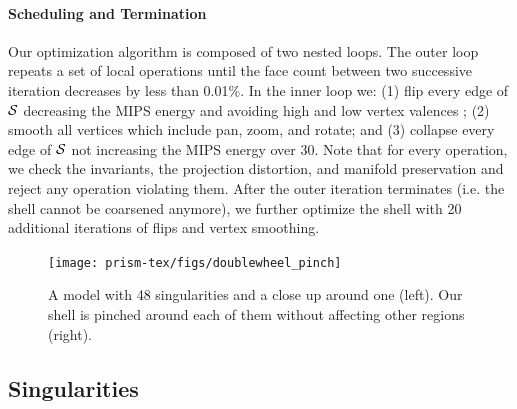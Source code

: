 \paragraph{Scheduling and Termination}
Our optimization algorithm is composed of two nested loops. The outer loop repeats a set of local operations until the face count between two successive iteration decreases by less than 0.01\%. In the inner loop we: (1) flip every edge of $\S$ decreasing  the MIPS energy and avoiding high and low vertex valences \cite{dunyach2013adaptive}; (2) smooth all vertices which include pan, zoom, and rotate; and (3) collapse every edge of $\S$ not increasing the MIPS energy over {30}. Note that for every operation, we check the invariants, the projection distortion, and manifold preservation and reject any operation violating them.
%
After the outer iteration terminates (i.e.  the shell cannot be coarsened anymore), we further optimize the shell with 20 additional iterations of flips and vertex smoothing.






\begin{figure}
    \centering
    \texttt{[image: prism-tex/figs/doublewheel\_pinch]}
    \caption{A model with 48 singularities and a close up around one (left).
    Our shell is pinched around each of them without affecting other regions (right).}
    \label{prism:fig:singularity_example}
    
\end{figure}


\subsection{Singularities}\label{prism:sec:singularities}


